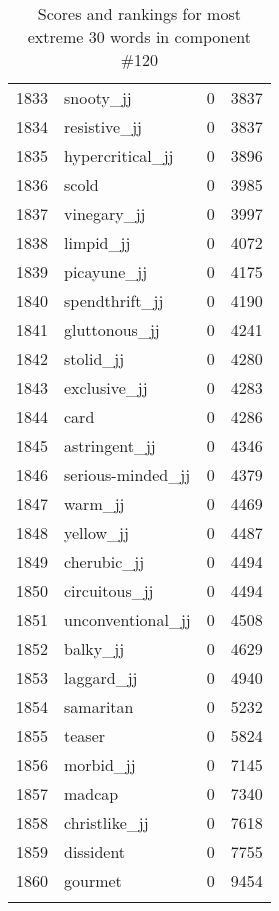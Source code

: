\begin{longtable}[!htbp]{| rlr@{.}l |}
    1833 & snooty\_jj & 0 & 3837 \\
    1834 & resistive\_jj & 0 & 3837 \\
    1835 & hypercritical\_jj & 0 & 3896 \\
    1836 & scold & 0 & 3985 \\
    1837 & vinegary\_jj & 0 & 3997 \\
    1838 & limpid\_jj & 0 & 4072 \\
    1839 & picayune\_jj & 0 & 4175 \\
    1840 & spendthrift\_jj & 0 & 4190 \\
    1841 & gluttonous\_jj & 0 & 4241 \\
    1842 & stolid\_jj & 0 & 4280 \\
    1843 & exclusive\_jj & 0 & 4283 \\
    1844 & card & 0 & 4286 \\
    1845 & astringent\_jj & 0 & 4346 \\
    1846 & serious-minded\_jj & 0 & 4379 \\
    1847 & warm\_jj & 0 & 4469 \\
    1848 & yellow\_jj & 0 & 4487 \\
    1849 & cherubic\_jj & 0 & 4494 \\
    1850 & circuitous\_jj & 0 & 4494 \\
    1851 & unconventional\_jj & 0 & 4508 \\
    1852 & balky\_jj & 0 & 4629 \\
    1853 & laggard\_jj & 0 & 4940 \\
    1854 & samaritan & 0 & 5232 \\
    1855 & teaser & 0 & 5824 \\
    1856 & morbid\_jj & 0 & 7145 \\
    1857 & madcap & 0 & 7340 \\
    1858 & christlike\_jj & 0 & 7618 \\
    1859 & dissident & 0 & 7755 \\
    1860 & gourmet & 0 & 9454 \\
    \hline
    \caption{Scores and rankings for most extreme 30 words in component \#120} \\
\end{longtable}
